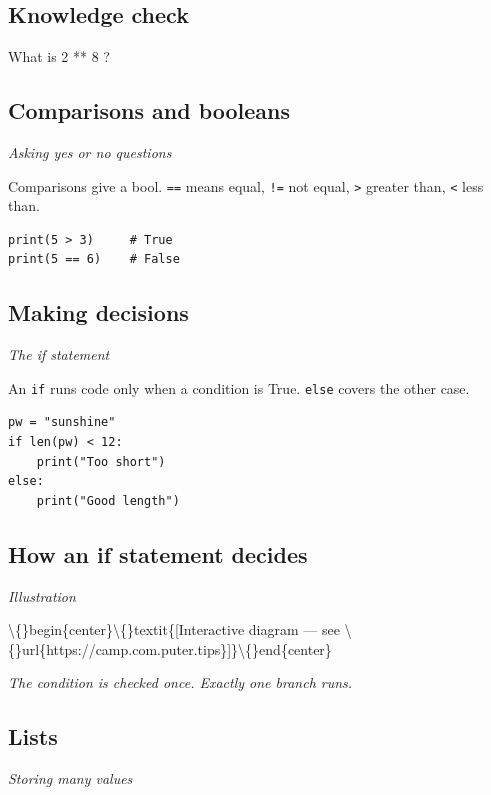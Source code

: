 \documentclass[12pt,openany]{book}
\begin{document}
\medskip

\subsection*{Knowledge check}

What is 2 ** 8 ?

\medskip

\subsection*{Comparisons and booleans}
{\small\itshape\color{gray}Asking yes or no questions}


Comparisons give a bool. \texttt{==} means equal, \texttt{!=} not equal, \texttt{\textgreater{}} greater than, \texttt{\textless{}} less than.

\begin{lstlisting}
print(5 > 3)     # True
print(5 == 6)    # False\end{lstlisting}

\medskip

\subsection*{Making decisions}
{\small\itshape\color{gray}The if statement}


An \texttt{if} runs code only when a condition is True. \texttt{else} covers the other case.

\begin{lstlisting}
pw = "sunshine"
if len(pw) < 12:
    print("Too short")
else:
    print("Good length")\end{lstlisting}

\medskip

\subsection*{How an if statement decides}
{\small\itshape\color{gray}Illustration}

\textbackslash\{\}begin\{center\}\textbackslash\{\}textit\{[Interactive diagram --- see \textbackslash\{\}url\{https://camp.com.puter.tips\}]\}\textbackslash\{\}end\{center\}

{\small\itshape\color{gray}The condition is checked once. Exactly one branch runs.}

\medskip

\subsection*{Lists}
{\small\itshape\color{gray}Storing many values}
\end{document}
